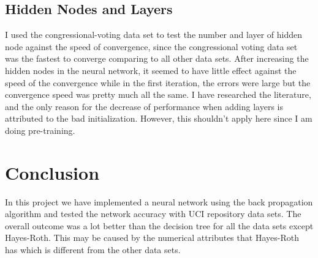 \documentclass{sig-alternate-05-2015}
\begin{document}
\subsection{Hidden Nodes and Layers}
I used the congressional-voting data set to test the number and layer of hidden node against the speed of convergence, since the congressional voting data set was the fastest to converge comparing to all other data sets. After increasing the hidden nodes in the neural network, it seemed to have little effect against the speed of the convergence while in the first iteration, the errors were large but the convergence speed was pretty much all the same. I have researched the literature, and the only reason for the decrease of performance when adding layers is attributed to the bad initialization. However, this shouldn't apply here since I am doing pre-training.

\section{Conclusion}
In this project we have implemented a neural network using the back propagation algorithm and tested the network accuracy with UCI repository data sets. The overall outcome was a lot better than the decision tree for all the data sets except Hayes-Roth. This may be caused by the numerical attributes that Hayes-Roth has which is different from the other data sets. 
\end{document}
